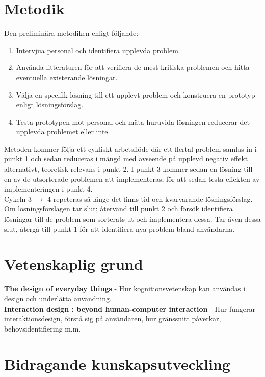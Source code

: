 \documentclass{article}
\begin{document}
\section*{Metodik}

  Den preliminära metodiken enligt följande:
  \begin{enumerate}
    \item{Intervjua personal och identifiera upplevda problem.}
    \item{Använda litteraturen för att verifiera de mest kritiska problemen och
        hitta eventuella existerande lösningar.}
    \item{Välja en specifik lösning till ett upplevt problem och konstruera en
        prototyp enligt lösningsförslag.}
    \item{Testa prototypen mot personal och mäta huruvida lösningen reducerar
        det upplevda problemet eller inte.}
  \end{enumerate}

  Metoden kommer följa ett cykliskt arbetsflöde där ett flertal problem samlas
  in i punkt 1 och sedan reduceras i mängd med avseende på upplevd negativ
  effekt alternativt, teoretisk relevans i punkt 2. I punkt 3 kommer sedan en
  lösning till en av de utsorterade problemen att implementeras, för att sedan
  testa effekten av implementeringen i punkt 4. \\

  Cykeln 3 $\rightarrow$ 4 repeteras så länge det finns tid och kvarvarande
  lösningsförslag. Om lösningsförslagen tar slut; återvänd till punkt 2 och
  försök identifiera lösningar till de problem som sorterats ut och
  implementera dessa. Tar även dessa slut, återgå till punkt 1 för att
  identifiera nya problem bland användarna.

\section*{Vetenskaplig grund}

  \textbf{The design of everyday things}\cite{c_design_norman} -
  Hur kognitionsvetenskap kan användas i design och underlätta användning. \\

  \textbf{Interaction design : beyond human-computer
    interaction}\cite{c_interaction_design} -
  Hur fungerar interaktionsdesign, förstå sig på användaren, hur gränssnitt
  påverkar, behovsidentifiering m.m.

\section*{Bidragande kunskapsutveckling}
\end{document}
